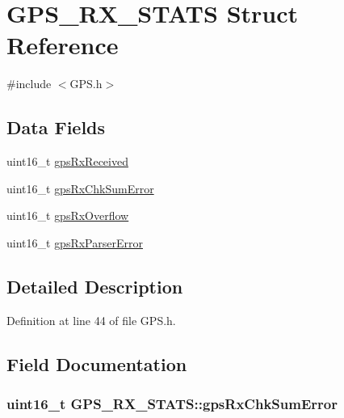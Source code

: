 \hypertarget{struct_g_p_s___r_x___s_t_a_t_s}{\section{\-G\-P\-S\-\_\-\-R\-X\-\_\-\-S\-T\-A\-T\-S \-Struct \-Reference}
\label{struct_g_p_s___r_x___s_t_a_t_s}
}


{\ttfamily \#include $<$\-G\-P\-S.\-h$>$}

\subsection*{\-Data \-Fields}
\begin{DoxyCompactItemize}
\item 
uint16\-\_\-t \hyperlink{struct_g_p_s___r_x___s_t_a_t_s_a2cc140780bc89226502f3903c38c8a30}{gps\-Rx\-Received}
\item 
uint16\-\_\-t \hyperlink{struct_g_p_s___r_x___s_t_a_t_s_a1a89019cb1163e32575738685ef79317}{gps\-Rx\-Chk\-Sum\-Error}
\item 
uint16\-\_\-t \hyperlink{struct_g_p_s___r_x___s_t_a_t_s_a1820743f7205c836af17a100834732b4}{gps\-Rx\-Overflow}
\item 
uint16\-\_\-t \hyperlink{struct_g_p_s___r_x___s_t_a_t_s_a89bf9e59acfe33d00d4a319ec4f84cd7}{gps\-Rx\-Parser\-Error}
\end{DoxyCompactItemize}


\subsection{\-Detailed \-Description}


\-Definition at line 44 of file \-G\-P\-S.\-h.



\subsection{\-Field \-Documentation}
\hypertarget{struct_g_p_s___r_x___s_t_a_t_s_a1a89019cb1163e32575738685ef79317}{
\subsubsection[{gps\-Rx\-Chk\-Sum\-Error}]{\setlength{\rightskip}{0pt plus 5cm}uint16\-\_\-t {\bf \-G\-P\-S\-\_\-\-R\-X\-\_\-\-S\-T\-A\-T\-S\-::gps\-Rx\-Chk\-Sum\-Error}}}\label{struct_g_p_s___r_x___s_t_a_t_s_a1a89019cb1163e32575738685ef79317}


